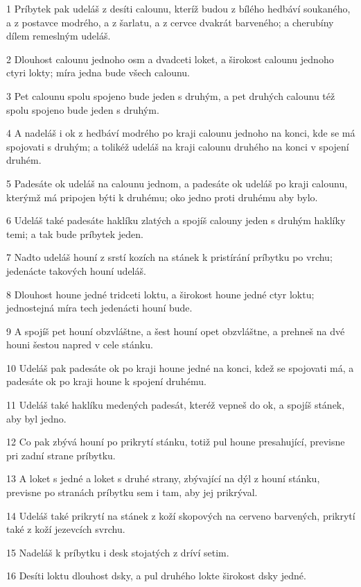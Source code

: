 \par 1 Príbytek pak udeláš z desíti calounu, kteríž budou z bílého hedbáví soukaného, a z postavce modrého, a z šarlatu, a z cervce dvakrát barveného; a cherubíny dílem remeslným udeláš.
\par 2 Dlouhost calounu jednoho osm a dvadceti loket, a širokost calounu jednoho ctyri lokty; míra jedna bude všech calounu.
\par 3 Pet calounu spolu spojeno bude jeden s druhým, a pet druhých calounu též spolu spojeno bude jeden s druhým.
\par 4 A nadeláš i ok z hedbáví modrého po kraji calounu jednoho na konci, kde se má spojovati s druhým; a tolikéž udeláš na kraji calounu druhého na konci v spojení druhém.
\par 5 Padesáte ok udeláš na calounu jednom, a padesáte ok udeláš po kraji calounu, kterýmž má pripojen býti k druhému; oko jedno proti druhému aby bylo.
\par 6 Udeláš také padesáte haklíku zlatých a spojíš calouny jeden s druhým haklíky temi; a tak bude príbytek jeden.
\par 7 Nadto udeláš houní z srstí kozích na stánek k pristírání príbytku po vrchu; jedenácte takových houní udeláš.
\par 8 Dlouhost houne jedné tridceti loktu, a širokost houne jedné ctyr loktu; jednostejná míra tech jedenácti houní bude.
\par 9 A spojíš pet houní obzvláštne, a šest houní opet obzvláštne, a prehneš na dvé houni šestou napred v cele stánku.
\par 10 Udeláš pak padesáte ok po kraji houne jedné na konci, kdež se spojovati má, a padesáte ok po kraji houne k spojení druhému.
\par 11 Udeláš také haklíku medených padesát, kteréž vepneš do ok, a spojíš stánek, aby byl jedno.
\par 12 Co pak zbývá houní po prikrytí stánku, totiž pul houne presahující, previsne pri zadní strane príbytku.
\par 13 A loket s jedné a loket s druhé strany, zbývající na dýl z houní stánku, previsne po stranách príbytku sem i tam, aby jej prikrýval.
\par 14 Udeláš také prikrytí na stánek z koží skopových na cerveno barvených, prikrytí také z koží jezevcích svrchu.
\par 15 Nadeláš k príbytku i desk stojatých z dríví setim.
\par 16 Desíti loktu dlouhost dsky, a pul druhého lokte širokost dsky jedné.
